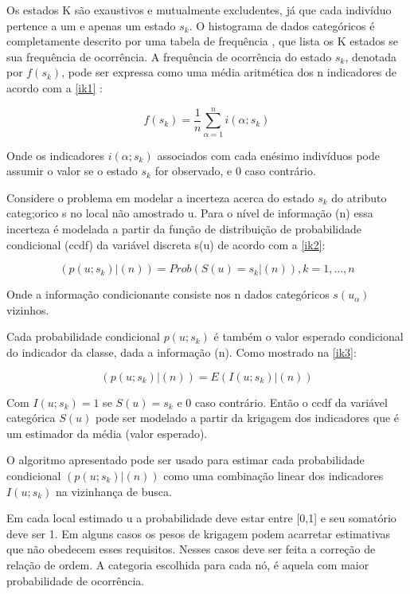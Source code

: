 Os estados K são exaustivos e mutualmente excludentes, já que cada indivíduo pertence a um e apenas um estado $s_{k}$. O histograma de dados categóricos é completamente descrito por uma tabela de frequência , que lista os K estados se sua frequência de ocorrência. A frequência de ocorrência do estado $s_{k}$, denotada por $f(s_{k})$, pode ser expressa como uma média aritmética dos n indicadores de acordo com a \autoref{ik1} \cite{goovaerts1997geostatistics}:

\begin{equation}
	f(s_{k})=\frac{1}{n}\sum_{\alpha=1}^{n}i(\alpha;s_{k})
	\label{ik1}
\end{equation}

Onde os indicadores $i(\alpha;s_{k})$ associados com cada enésimo indivíduos pode assumir o valor se o estado $s_{k}$ for observado, e 0 caso contrário.

Considere o problema em modelar a incerteza acerca do estado $s_{k}$ do atributo categ;orico s no local não amostrado u. Para o nível de informação (n) essa incerteza é modelada a partir da função de distribuição de probabilidade condicional (ccdf) da variável discreta s(u) de acordo com a \autoref{ik2}:

\begin{equation}
	(p(u;s_{k})|(n))=Prob(S(u)=s_{k}|(n)), k=1,...,n
	\label{ik2}
\end{equation}

Onde a informação condicionante consiste nos n dados categóricos $s(u_{\alpha})$ vizinhos.

Cada probabilidade condicional $p(u;s_{k})$ é também o valor esperado condicional do indicador da classe, dada a informação (n). Como mostrado na \autoref{ik3}:

\begin{equation}
	(p(u;s_{k})|(n))=E(I(u;s_{k})|(n))
	\label{ik3}
\end{equation}

Com $I(u;s_{k})=1$ se $S(u)=s_{k}$ e 0 caso contrário. Então o ccdf da variável categórica $S(u)$ pode ser modelado a partir da krigagem dos indicadores que é um estimador da média (valor esperado).

O algoritmo apresentado pode ser usado para estimar cada probabilidade condicional $(p(u;s_{k})|(n))$ como uma combinação linear dos indicadores $I(u;s_{k})$ na vizinhança de busca.

Em cada local estimado u a probabilidade deve estar entre  [0,1] e seu somatório deve ser 1. Em alguns casos os pesos de krigagem podem acarretar estimativas que não obedecem esses requisitos. Nesses casos deve ser feita a correção de relação de ordem. A categoria escolhida para cada nó, é aquela com maior probabilidade de ocorrência.


